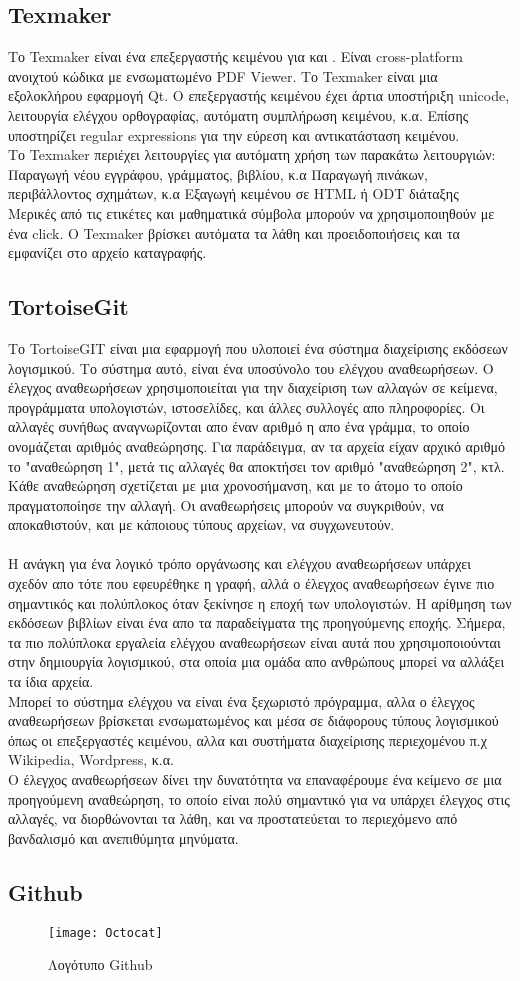 \subsection{Texmaker}
Το Texmaker είναι ένα επεξεργαστής κειμένου για  και . Είναι cross-platform ανοιχτού κώδικα με ενσωματωμένο PDF Viewer. Το Texmaker είναι μια εξολοκλήρου εφαρμογή Qt.
O επεξεργαστής κειμένου έχει άρτια υποστήριξη unicode, λειτουργία ελέγχου ορθογραφίας, αυτόματη συμπλήρωση κειμένου, κ.α. Επίσης υποστηρίζει regular expressions για την εύρεση και αντικατάσταση κειμένου.\\
Το Texmaker περιέχει λειτουργίες για αυτόματη χρήση των παρακάτω λειτουργιών:\\
Παραγωγή νέου εγγράφου, γράμματος, βιβλίου, κ.α
Παραγωγή πινάκων, περιβάλλοντος σχημάτων, κ.α
Εξαγωγή κειμένου σε HTML ή ODT διάταξης
\\
Μερικές από τις ετικέτες  και μαθηματικά σύμβολα μπορούν να χρησιμοποιηθούν με ένα click. Ο Texmaker βρίσκει αυτόματα τα λάθη και προειδοποιήσεις και τα εμφανίζει στο αρχείο καταγραφής.\\

\subsection{TortoiseGit}
Το TortoiseGIT είναι μια εφαρμογή που υλοποιεί ένα σύστημα διαχείρισης εκδόσεων λογισμικού. Το σύστημα αυτό, είναι ένα υποσύνολο του ελέγχου αναθεωρήσεων. Ο έλεγχος αναθεωρήσεων χρησιμοποιείται για την διαχείριση των αλλαγών σε κείμενα, προγράμματα υπολογιστών, ιστοσελίδες, και άλλες συλλογές απο πληροφορίες. Οι αλλαγές συνήθως αναγνωρίζονται απο έναν αριθμό η απο ένα γράμμα, το οποίο ονομάζεται αριθμός αναθεώρησης. Για παράδειγμα, αν τα αρχεία είχαν αρχικό αριθμό το "αναθεώρηση 1", μετά τις αλλαγές θα αποκτήσει τον αριθμό "αναθεώρηση 2", κτλ. Κάθε αναθεώρηση σχετίζεται με μια χρονοσήμανση, και με το άτομο το οποίο πραγματοποίησε την αλλαγή. Οι αναθεωρήσεις μπορούν να συγκριθούν, να αποκαθιστούν, και με κάποιους τύπους αρχείων, να συγχωνευτούν.\\
\\
Η ανάγκη για ένα λογικό τρόπο οργάνωσης και ελέγχου αναθεωρήσεων υπάρχει σχεδόν απο τότε που εφευρέθηκε η γραφή, αλλά ο έλεγχος αναθεωρήσεων έγινε πιο σημαντικός και πολύπλοκος όταν ξεκίνησε η εποχή των υπολογιστών. Η αρίθμηση των εκδόσεων βιβλίων είναι ένα απο τα παραδείγματα της προηγούμενης εποχής. Σήμερα, τα πιο πολύπλοκα εργαλεία ελέγχου αναθεωρήσεων είναι αυτά που χρησιμοποιούνται στην δημιουργία λογισμικού, στα οποία μια ομάδα απο ανθρώπους μπορεί να αλλάξει τα ίδια αρχεία.\\
Μπορεί το σύστημα ελέγχου να είναι ένα ξεχωριστό πρόγραμμα, αλλα ο έλεγχος αναθεωρήσεων βρίσκεται ενσωματωμένος και μέσα σε διάφορους τύπους λογισμικού όπως οι επεξεργαστές κειμένου, αλλα και συστήματα διαχείρισης περιεχομένου
π.χ Wikipedia, Wordpress, κ.α.\\
Ο έλεγχος αναθεωρήσεων δίνει την δυνατότητα να επαναφέρουμε ένα κείμενο σε μια προηγούμενη αναθεώρηση, το οποίο είναι πολύ σημαντικό για να υπάρχει έλεγχος στις αλλαγές, να διορθώνονται τα λάθη, και να προστατεύεται το περιεχόμενο από βανδαλισμό και ανεπιθύμητα μηνύματα.
\subsection{Github}
\begin{figure}[h]
\centering
\texttt{[image: Octocat]}
\caption{Λογότυπο Github}
\end{figure}